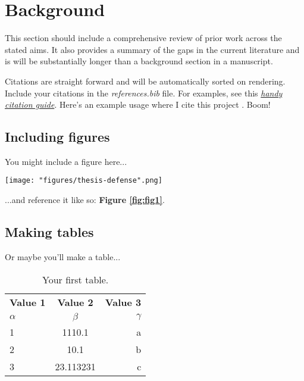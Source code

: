 \center

\section{Background}

\raggedright

This section should include a comprehensive review of prior work across the stated aims. It also provides a summary of the gaps in the current literature and is will be substantially longer than a background section in a manuscript.


Citations are straight forward and will be automatically sorted on rendering. Include your citations in the \textit{references.bib} file. For examples, see this  \textit{\href{https://libguides.nps.edu/citation/ieee-bibtex}{handy citation guide}}. Here's an example usage where I cite this project \cite{OHSU-overleaf-dissertation-template}. Boom!


\subsection{Including figures}

You might include a figure here...

\begin{figure*}
  \centering
  \texttt{[image: "figures/thesis-defense".png]}
  \caption{\textbf{The best thesis defense is a good thesis offense.} A conceptual illustration of the celebrated thesis \textit{offense}, an ambitious but often effective tactical maneuver.}
  \label{fig:fig1}
\end{figure*}

...and reference it like so: \textbf{Figure \ref{fig:fig1}}.


\subsection{Making tables}

Or maybe you'll make a table...

\begin{table}[h!]
  \begin{center}
    \caption{Your first table.}
    \label{tab:table1}
    \begin{tabular}{l|c|r} %
      \textbf{Value 1} & \textbf{Value 2} & \textbf{Value 3}\\
      $\alpha$ & $\beta$ & $\gamma$ \\
      \hline
      1 & 1110.1 & a\\
      2 & 10.1 & b\\
      3 & 23.113231 & c\\
    \end{tabular}
    \label{table:table1}
  \end{center}
\end{table}

